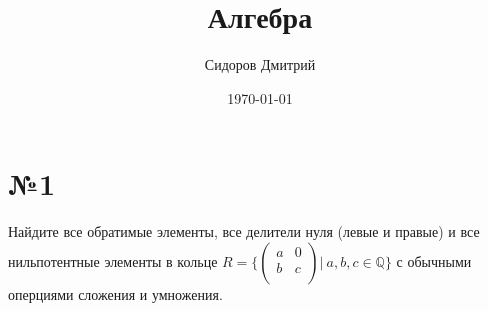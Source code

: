 \documentclass[a4paper, 16pt]{article}
\title{Алгебра}
\date{\today}
\author{Сидоров Дмитрий}
\affil{Группа БПМИ 219}
\newcommand{\Q} {\mathbb{Q}}
\begin{document}
	\maketitle
	
	\section*{№1}
	
		Найдите все обратимые элементы, все делители нуля (левые и правые) и все нильпотентные элементы в кольце $R = \{ \begin{pmatrix}
			a & 0 \\
			b & c \\
		\end{pmatrix} | \ a, b, c \in \Q\}$ с обычными оперциями сложения и умножения.
	
\end{document}
